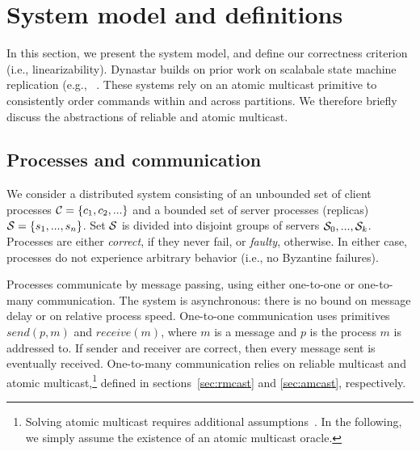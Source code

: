 \section{System model and definitions}
\label{sec:sysmodel}

In this section, we present the system model, and define our
correctness criterion (i.e., linearizability).  Dynastar builds on
prior work on scalabale state machine replication (e.g.,
~\cite{bezerra2014ssmr, hoang2016}. These systems rely on an atomic
multicast primitive to consistently order commands within and across
partitions.  We therefore briefly discuss the abstractions of reliable
and atomic multicast. 




\subsection{Processes and communication}

We consider a distributed system consisting of an unbounded set of
client processes $\mathcal{C} = \{c_1, c_2, ...\}$ and a bounded set of
server processes (replicas) $\mathcal{S} = \{s_1, ..., s_n\}$.  Set $\mathcal{S}$ is
divided into disjoint groups of servers $\mathcal{S}_0, ..., \mathcal{S}_k$.
Processes are either \emph{correct}, if they never fail, or
\emph{faulty}, otherwise.  In either case, processes do not experience
arbitrary behavior (i.e., no Byzantine failures).

Processes communicate by message passing, using either one-to-one or
one-to-many communication.  The system is asynchronous: there is no
bound on message delay or on relative process speed.  One-to-one
communication uses primitives $send(p,m)$ and $receive(m)$, where $m$
is a message and $p$ is the process $m$ is addressed to.  If sender
and receiver are correct, then every message sent is eventually
received.
%
One-to-many communication relies on reliable multicast and atomic
multicast,\footnote{Solving atomic multicast requires additional
  assumptions~\cite{CT96,FLP85}. In the following, we simply assume
  the existence of an atomic multicast oracle.}  defined in
sections~\ref{sec:rmcast} and \ref{sec:amcast}, respectively.



